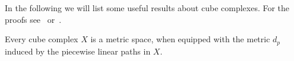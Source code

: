 


In the following we will list some useful results about cube complexes. For the proofs see~\cite[Appendices A, B]{MR3029427} or\ \cite[Sec. I.7, II.5]{MR1744486}.

\begin{thm}[{\cite[I.7.10]{MR1744486}}]
  \label{thm:metric}
  Every cube complex \(X\) is a metric space, when equipped with the metric \(d_p\) induced by the piecewise linear paths in \(X\).
\end{thm}

